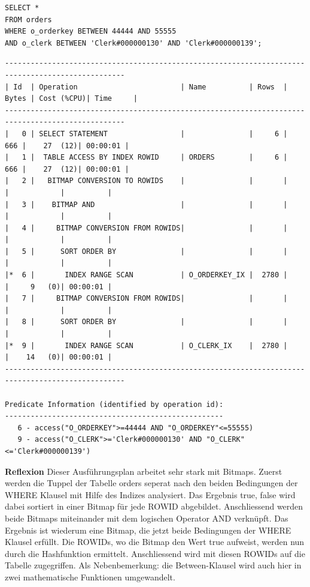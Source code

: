 \documentclass[10pt]{article}
\begin{document}
\begin{lstlisting}[style=sql]
SELECT *
FROM orders
WHERE o_orderkey BETWEEN 44444 AND 55555
AND o_clerk BETWEEN 'Clerk#000000130' AND 'Clerk#000000139';
\end{lstlisting}
\begin{lstlisting}[style=queryexecutionplanSmall]
--------------------------------------------------------------------------------------------------
| Id  | Operation                        | Name          | Rows  | Bytes | Cost (%CPU)| Time     |
--------------------------------------------------------------------------------------------------
|   0 | SELECT STATEMENT                 |               |     6 |   666 |    27  (12)| 00:00:01 |
|   1 |  TABLE ACCESS BY INDEX ROWID     | ORDERS        |     6 |   666 |    27  (12)| 00:00:01 |
|   2 |   BITMAP CONVERSION TO ROWIDS    |               |       |       |            |          |
|   3 |    BITMAP AND                    |               |       |       |            |          |
|   4 |     BITMAP CONVERSION FROM ROWIDS|               |       |       |            |          |
|   5 |      SORT ORDER BY               |               |       |       |            |          |
|*  6 |       INDEX RANGE SCAN           | O_ORDERKEY_IX |  2780 |       |     9   (0)| 00:00:01 |
|   7 |     BITMAP CONVERSION FROM ROWIDS|               |       |       |            |          |
|   8 |      SORT ORDER BY               |               |       |       |            |          |
|*  9 |       INDEX RANGE SCAN           | O_CLERK_IX    |  2780 |       |    14   (0)| 00:00:01 |
--------------------------------------------------------------------------------------------------
 
Predicate Information (identified by operation id):
---------------------------------------------------
   6 - access("O_ORDERKEY">=44444 AND "O_ORDERKEY"<=55555)
   9 - access("O_CLERK">='Clerk#000000130' AND "O_CLERK"<='Clerk#000000139')
\end{lstlisting}
\textbf{Reflexion} \newline
Dieser Ausführungsplan arbeitet sehr stark mit Bitmaps. Zuerst werden die Tuppel der Tabelle orders seperat nach den beiden Bedingungen der WHERE Klausel mit Hilfe des Indizes analysiert. Das Ergebnis {true, false} wird dabei sortiert in einer Bitmap für jede ROWID abgebildet.
Anschliessend werden beide Bitmaps miteinander mit dem logischen Operator AND verknüpft. Das Ergebnis ist wiederum eine Bitmap, die jetzt beide Bedingungen der WHERE Klausel erfüllt. Die ROWIDs, wo die Bitmap den Wert {true} aufweist, werden nun durch die Hashfunktion ermittelt. Anschliessend wird mit diesen ROWIDs auf die Tabelle zugegriffen. \newline
Als Nebenbemerkung: die Between-Klausel wird auch hier in zwei mathematische Funktionen umgewandelt.
\end{document}
